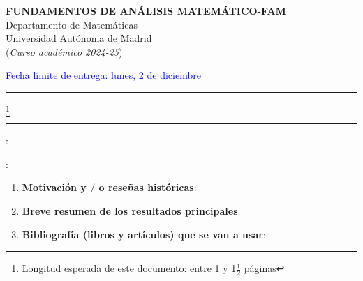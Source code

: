 \documentclass[11pt,a4paper,draft]{article}
\newcommand{\blue}{\textcolor{blue}}
\begin{document}
\begin{center}{\bf FUNDAMENTOS DE ANÁLISIS MATEMÁTICO-FAM}  \\
Departamento de Matemáticas\\
Universidad Autónoma de Madrid\\
({\it Curso académico 2024-25})
\end{center}
\hfill \blue{\small Fecha límite de entrega: lunes, 2 de diciembre}
\vskip 6pt \hrule

\vskip 3mm
 \footnote{Longitud esperada de este documento:  entre 1 y 1$\frac 12$ páginas }
\vskip 3mm \hrule

\vskip 5mm

:

\vskip 5mm

:



\vskip 1cm

\begin{enumerate}

\item[1.-] {\bf  Motivación y $/$ o reseñas históricas}: 

\item[2.-] {\bf Breve resumen de los resultados principales}: 

\item[3.-] {\bf Bibliografía (libros y artículos) que se van a usar}: \\


\end{enumerate}
\end{document}

